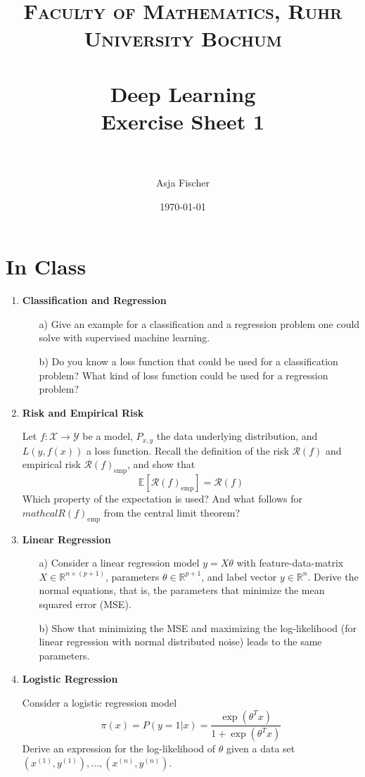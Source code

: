 \documentclass[paper=a4, fontsize=11pt]{scrartcl} %
\title{	
\normalfont \normalsize 
\textsc{Faculty of Mathematics, Ruhr University Bochum} \\ [25pt] %
\horrule{0.5pt} \\[0.4cm] %
\huge Deep Learning\\{\Large Exercise Sheet 1}\\ %
\horrule{2pt} \\[0.5cm] %
}
\author{Asja Fischer} %
\date{\normalsize\today} %
\numberwithin{equation}{section} %
\numberwithin{figure}{section} %
\numberwithin{table}{section} %
\begin{document}
\maketitle %
\section{In Class}
\begin{enumerate} 
\item \textbf{Classification and Regression}
\begin{itemize}
\item[a)]Give an example for a classification and a regression problem one could solve with supervised machine learning.
\item[b)]Do you know a loss function that could be used for a classification problem? What kind of loss function could be used for a regression problem?
\end{itemize}


\item \textbf{Risk and Empirical Risk}

Let $f: \mathcal{X} \rightarrow \mathcal{Y}$ be a model, $P_{x,y}$ the data underlying distribution, and $L(y, f(x))$ a loss function. Recall the definition of the risk  $\mathcal{R}(f)$ and empirical risk 
 $\mathcal{R}(f)_{\text{emp}}$, and show that
 $$
 \mathbb{E}[\mathcal{R}(f)_{\text{emp}}] = \mathcal{R}(f)
 $$
Which property of the expectation is used?  And what follows for $mathcal{R}(f)_{\text{emp}}$ from the central limit theorem? 


\item \textbf{Linear Regression}
\begin{itemize}
\item[a)] Consider a linear regression model $y= X\theta$  with feature-data-matrix $X \in \mathbb{R}^{n \times (p+1)}$, parameters $\theta\in \mathbb{R}^{p+1}$, and label vector $y \in \mathbb{R}^{n}$. Derive the normal equations, that is, the parameters that minimize the mean squared error (MSE). 
\item[b)] Show that minimizing the MSE and maximizing the log-likelihood (for linear regression with normal distributed noise) leads to the same parameters. 
\end{itemize}

\item \textbf{Logistic Regression}

Consider a logistic regression model 
$$
\pi(x) = P(y=1|x) = \frac{\exp(\theta^Tx)}{1+\exp(\theta^Tx)}
$$
Derive an expression for the log-likelihood of $\theta$ given a data set $(x^{(1)}, y^{(1)}), \dots, (x^{(n)}, y^{(n)})$.






\end{enumerate}
\end{document}
